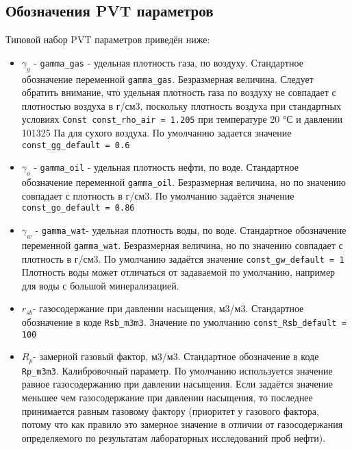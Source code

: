 \subsection{Обозначения PVT параметров}
Типовой набор PVT параметров приведён ниже:


\begin{itemize}
	
\item	$\gamma_g$  - \texttt{gamma_gas} - удельная плотность газа, по воздуху. Стандартное обозначение переменной \texttt{gamma_gas}. Безразмерная величина. Следует обратить внимание, что удельная плотность газа по воздуху не совпадает с плотностью воздуха в г/см3, поскольку плотность воздуха при стандартных условиях \texttt{Const const_rho_air = 1.205} при температуре 20 °С и давлении 101325 Па для сухого воздуха. По умолчанию задается значение \texttt{const_gg_default = 0.6}

\item $\gamma_o$  - \texttt{gamma_oil} - удельная плотность нефти, по воде. Стандартное обозначение переменной \texttt{gamma_oil}. Безразмерная величина, но по значению совпадает с плотность в г/см3. По умолчанию задаётся значение \texttt{const_go_default = 0.86}

\item $\gamma_w$  - \texttt{gamma_wat}- удельная плотность воды, по воде. Стандартное обозначение переменной \texttt{gamma_wat}. Безразмерная величина, но по значению совпадает с плотность в г/см3. По умолчанию задаётся значение \texttt{const_gw_default = 1} Плотность воды может отличаться от задаваемой по умолчанию, например для воды с большой минерализацией.  

\item $r_{sb}$- газосодержание при давлении насыщения, м3/м3. Стандартное обозначение в коде \texttt{Rsb_m3m3}. Значение по умолчанию \texttt{const_Rsb_default = 100}

\item $R_p$-  замерной газовый фактор, м3/м3. Стандартное обозначение в коде \texttt{Rp_m3m3}. Калибровочный параметр. По умолчанию используется значение равное газосодержанию при давлении насыщения. Если задаётся значение меньшее чем газосодержание при давлении насыщения, то последнее принимается равным газовому фактору (приоритет у газового фактора, потому что как правило это замерное значение в отличии от газосодержания определяемого по результатам лабораторных исследований проб нефти).


\end{itemize}
